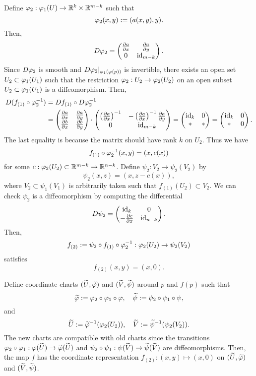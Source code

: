 \documentclass{../exp}
\begin{document}
\begin{pf}
Define $\f_2:\f_1(U)\to\R^k\x\R^{m-k}$ such that
\[\varphi_2(x,y):=(a(x,y),y).\]
Then,
\[D\f_2=\begin{pmatrix}\pd{a}{x}&\pd{a}{y}\\0&\id_{m-k}\end{pmatrix}.\]
Since $D\varphi_2$ is smooth and $D\varphi_2|_{\varphi_1(\varphi(p))}$ is invertible, there exists an open set $U_2\subset\varphi_1(U_1)$ such that the restriction $\f_2:U_2\to\f_2(U_2)$ on an open subset $U_2\subset\varphi_1(U_1)$ is a diffeomorphism.
Then,
\begin{align*}
D(f_{(1)}\o\f_2^{-1})
&=Df_{(1)}\o D\f_2^{-1}\\
&=\begin{pmatrix}\pd{a}{x}&\pd{a}{y}\\\pd{b}{x}&\pd{b}{y}\end{pmatrix}\cdot\begin{pmatrix}\left(\pd{a}{x}\right)^{-1}&-\left(\pd{a}{x}\right)^{-1}\pd{a}{y}\\0&\id_{m-k}\end{pmatrix}
=\begin{pmatrix}\id_k&0\\ * & * \end{pmatrix}
=\begin{pmatrix}\id_k&0\\ * &0\end{pmatrix}.
\end{align*}
The last equality is because the matrix should have rank $k$ on $U_2$.
Thus we have
\[f_{(1)}\o\f_2^{-1}(x,y)=(x,c(x))\]
for some $c:\f_2(U_2)\subset\R^{m-k}\to\R^{n-k}$.
Define $\psi_2:V_2\to\psi_2(V_2)$ by
\[\psi_2(x,z)=(x,z-c(x)),\]
where $V_2\subset\psi_1(V_1)$ is arbitrarily taken such that $f_{(1)}(U_2)\subset V_2$.
We can check $\psi_2$ is a diffeomorphism by computing the differential
\[D\psi_2=\begin{pmatrix}\id_k&0\\-\pd{c}{x}&\id_{n-k}\end{pmatrix}.\]
Then,
\[f_{(2)}:=\psi_2\o f_{(1)}\o\f_2^{-1}:\f_2(U_2)\to\psi_2(V_2)\]
satisfies
\[f_{(2)}(x,y)=(x,0).\]

Define coordinate charts $(\widetilde U,\widetilde{\varphi})$ and $(\widetilde V,\widetilde\psi)$ around $p$ and $f(p)$ such that
\[\tld\f:=\f_2\o\f_1\o\f,\quad\tld\psi:=\psi_2\o\psi_1\o\psi,\]
and
\[\widetilde U:=\widetilde{\varphi}^{-1}(\varphi_2(U_2)),\quad\widetilde V:=\widetilde\psi^{-1}(\psi_2(V_2)).\]
The new charts are compatible with old charts since the transitions $\f_2\o\f_1:\f(\tld U)\to\tld\f(\tld U)$ and $\psi_2\o\psi_1:\psi(\tld V)\to\tld\psi(\tld V)$ are diffeomorphisms.
Then, the map $f$ has the coordinate representation $f_{(2)}:(x,y)\mapsto(x,0)$ on $(\widetilde U,\widetilde{\varphi})$ and $(\widetilde V,\widetilde\psi)$.
\end{pf}
\end{document}
